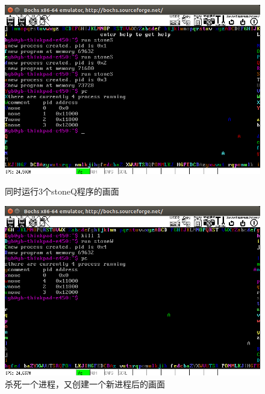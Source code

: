 \documentclass[a4paper]{article}
\begin{document}
    \begin{figure}
    \begin{minipage}{0.48\textwidth}
        \centering
        \includegraphics[width=\linewidth]{assets/three_stone_S.png}
    \caption{同时运行3个stoneQ程序的画面} \label{fig:3_stoneS}
    \end{minipage}\hfill
    \begin{minipage}{0.48\textwidth}
        \centering
        \includegraphics[width=\linewidth]{assets/kill_p.png}
    \caption{杀死一个进程，又创建一个新进程后的画面} \label{fig:kp}
    \end{minipage}
    \end{figure}
    
\end{document}
